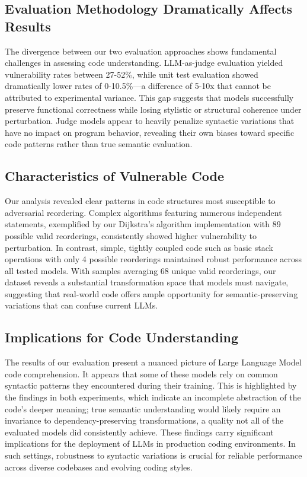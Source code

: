 \documentclass[%
thesis=student,%
coverpage=false,%
titlepage=false,%
headmarks=true, %
english,%
font=libertine, %
math=newpxtx, %
BCOR=5mm,%
coverBCOR=11mm%
]{tum-templates/book/tumbook}
\begin{document}
\subsection{Evaluation Methodology Dramatically Affects Results}
The divergence between our two evaluation approaches shows fundamental challenges in assessing code understanding. LLM-as-judge evaluation yielded vulnerability rates between 27-52\%, while unit test evaluation showed dramatically lower rates of 0-10.5\%—a difference of 5-10x that cannot be attributed to experimental variance. This gap suggests that models successfully preserve functional correctness while losing stylistic or structural coherence under perturbation. Judge models appear to heavily penalize syntactic variations that have no impact on program behavior, revealing their own biases toward specific code patterns rather than true semantic evaluation.

\subsection{Characteristics of Vulnerable Code}
Our analysis revealed clear patterns in code structures most susceptible to adversarial reordering. Complex algorithms featuring numerous independent statements, exemplified by our Dijkstra's algorithm implementation with 89 possible valid reorderings, consistently showed higher vulnerability to perturbation. In contrast, simple, tightly coupled code such as basic stack operations with only 4 possible reorderings maintained robust performance across all tested models. With samples averaging 68 unique valid reorderings, our dataset reveals a substantial transformation space that models must navigate, suggesting that real-world code offers ample opportunity for semantic-preserving variations that can confuse current LLMs.


\subsection{Implications for Code Understanding}

The results of our evaluation present a nuanced picture of Large Language Model code comprehension. It appears that some of these models rely on common syntactic patterns they encountered during their training. This is highlighted by the findings in both experiments, which indicate an incomplete abstraction of the code's deeper meaning; true semantic understanding would likely require an invariance to dependency-preserving transformations, a quality not all of the evaluated models did consistently achieve. These findings carry significant implications for the deployment of LLMs in production coding environments. In such settings, robustness to syntactic variations is crucial for reliable performance across diverse codebases and evolving coding styles.
\end{document}
